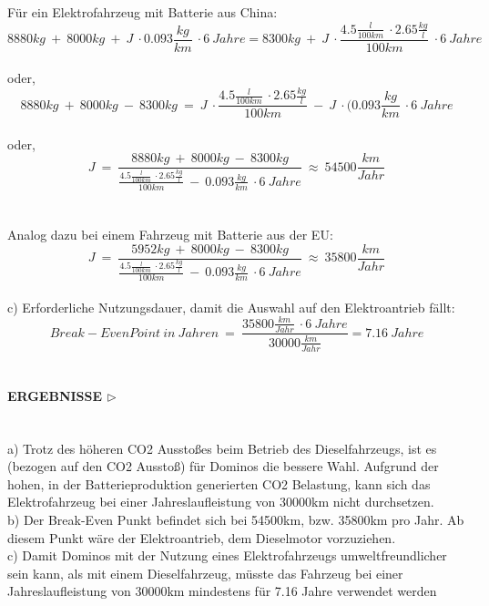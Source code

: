 \documentclass[13pt,titlepage]{article}
\begin{document}
Für ein Elektrofahrzeug mit Batterie aus China:\\
$$8880kg\ +\ 8000kg\ +\ J\ \cdot  0.093\frac{kg}{km}\ \cdot  6\ Jahre= 8300kg\ +\ J\ \cdot  \frac{4.5\frac{l}{100km}\ \cdot  2.65\frac{kg}{l}}{100km}\ \cdot  6\ Jahre $$\\
oder, \\
$$8880kg\ +\ 8000kg\ -\ 8300kg\ =\ J\ \cdot  \frac{4.5\frac{l}{100km}\ \cdot  2.65\frac{kg}{l}}{100km}\ -\ J\ \cdot  (0.093\frac{kg}{km}\ \cdot  6\ Jahre$$\\
oder,\\
$$J\ =\ \frac{8880kg\ +\ 8000kg\ -\ 8300kg}{\frac{4.5\frac{l}{100km}\ \cdot  2.65\frac{kg}{l}}{100km}\ -\ 0.093\frac{kg}{km}\ \cdot  6\ Jahre}\ \approx \ 54500\frac{km}{Jahr}$$
\\\mbox{}\\
Analog dazu bei einem Fahrzeug mit Batterie aus der EU:\\

$$J\ =\ \frac{5952kg\ +\ 8000kg\ -\ 8300kg}{\frac{4.5\frac{l}{100km}\ \cdot  2.65\frac{kg}{l}}{100km}\ -\ 0.093\frac{kg}{km}\ \cdot  6\ Jahre}\ \approx\ 35800\frac{km}{Jahr}$$\\

c) Erforderliche Nutzungsdauer, damit die Auswahl auf den Elektroantrieb fällt:\\
$$ Break-Even Point\ in\ Jahren\ =\ \frac{35800\frac{km}{Jahr}\ \cdot  6\ Jahre}{30000\frac{km}{Jahr}} = 7.16 \ Jahre $$\\

\paragraph{\textbf{ERGEBNISSE} $\triangleright$ }\mbox{}\\


a) Trotz des höheren CO2 Ausstoßes beim Betrieb des Dieselfahrzeugs, ist es (bezogen auf den CO2 Ausstoß) für Dominos die bessere Wahl. Aufgrund der hohen, in der Batterieproduktion generierten CO2 Belastung, kann sich das Elektrofahrzeug bei einer Jahreslaufleistung von 30000km nicht durchsetzen.\\

b) Der Break-Even Punkt befindet sich bei 54500km, bzw. 35800km pro Jahr. Ab diesem Punkt wäre der Elektroantrieb, dem Dieselmotor vorzuziehen.\\

c) Damit Dominos mit der Nutzung eines Elektrofahrzeugs umweltfreundlicher sein kann, als mit einem Dieselfahrzeug, müsste das Fahrzeug bei einer Jahreslaufleistung von 30000km mindestens für 7.16 Jahre verwendet werden
\end{document}
